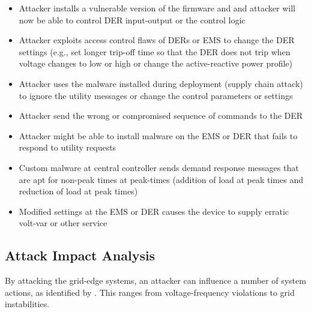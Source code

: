 \documentclass[conference]{IEEEtran}
\begin{document}
\begin{itemize}
 \item Attacker  installs a vulnerable version of the firmware and and attacker will now be able to control DER input-output or the control logic
 \item Attacker exploits access control flaws of  DERs or EMS to change the DER settings (e.g., set longer trip-off time so that the DER does not trip when voltage changes to low or high or change the active-reactive power profile) 
 \item Attacker uses the malware installed during deployment (supply chain attack) to ignore the utility messages  or change the control parameters or settings 
 \item Attacker send the wrong or compromised sequence of commands to the DER
 \item Attacker might be able to install malware on the EMS or DER that fails to respond to utility requests 
 \item Custom malware at central controller sends demand response messages that are apt for non-peak times at peak-times (addition of load at peak times and reduction of load at peak times) 
 \item Modified settings at the EMS or DER causes the device to supply erratic volt-var or other service 
\end{itemize}

\subsection{Attack Impact Analysis}
By attacking the grid-edge systems, an attacker can influence a number of system actions, as identified by \cite{DER:2017}. This ranges from voltage-frequency violations to grid instabilities.  
\end{document}
